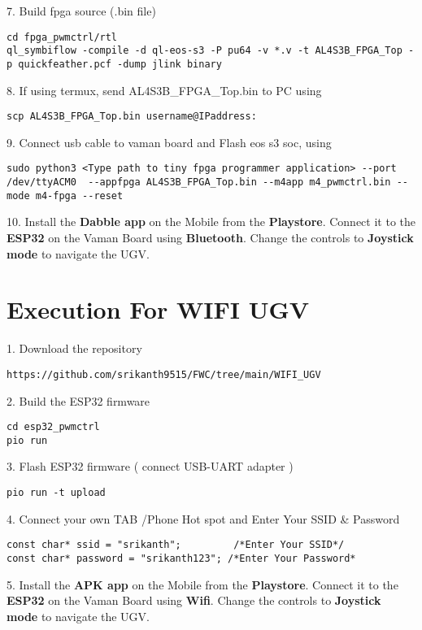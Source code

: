 \documentclass[journal,12pt,twocolumn]{IEEEtran}
\begin{document}
7. Build fpga source (.bin file)
\begin{lstlisting}
cd fpga_pwmctrl/rtl
ql_symbiflow -compile -d ql-eos-s3 -P pu64 -v *.v -t AL4S3B_FPGA_Top -p quickfeather.pcf -dump jlink binary 
\end{lstlisting} 

8. If using termux, send AL4S3B{\_}FPGA{\_}Top.bin to PC using
\begin{lstlisting}
scp AL4S3B_FPGA_Top.bin username@IPaddress:
\end{lstlisting} 

9. Connect usb cable to vaman board and Flash eos s3 soc, using
\begin{lstlisting}
sudo python3 <Type path to tiny fpga programmer application> --port /dev/ttyACM0  --appfpga AL4S3B_FPGA_Top.bin --m4app m4_pwmctrl.bin --mode m4-fpga --reset
\end{lstlisting} 

10. Install the \textbf{Dabble app} on the Mobile from the \textbf{Playstore}. Connect it to the \textbf{ESP32} on the Vaman Board using \textbf{Bluetooth}. Change the controls to \textbf{Joystick mode} to navigate the UGV.\\

\section{Execution For WIFI UGV}
\raggedright
1. Download the repository
\begin{lstlisting}
https://github.com/srikanth9515/FWC/tree/main/WIFI_UGV
\end{lstlisting}

2. Build the ESP32 firmware
\begin{lstlisting}
cd esp32_pwmctrl
pio run
\end{lstlisting} 

3. Flash ESP32 firmware ( connect USB-UART adapter )
\begin{lstlisting}
pio run -t upload
\end{lstlisting} 

4. Connect your own TAB /Phone Hot spot and  Enter Your SSID &  Password
\begin{lstlisting}
const char* ssid = "srikanth";         /*Enter Your SSID*/ 
const char* password = "srikanth123"; /*Enter Your Password*
\end{lstlisting} 
5. Install the \textbf{APK app} on the Mobile from the \textbf{Playstore}. Connect it to the \textbf{ESP32} on the Vaman Board using \textbf{Wifi}. Change the controls to \textbf{Joystick mode} to navigate the UGV.\\
\end{document}

